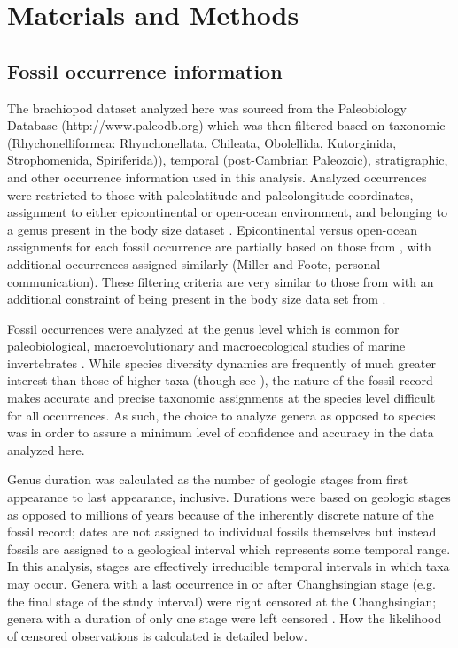 \documentclass{article}
\begin{document}
\section{Materials and Methods}

\subsection{Fossil occurrence information}

The brachiopod dataset analyzed here was sourced from the Paleobiology Database (http://www.paleodb.org) which was then filtered based on taxonomic (Rhychonelliformea: Rhynchonellata, Chileata, Obolellida, Kutorginida, Strophomenida, Spiriferida)), temporal (post-Cambrian Paleozoic), stratigraphic, and other occurrence information used in this analysis. Analyzed occurrences were restricted to those with paleolatitude and paleolongitude coordinates, assignment to either epicontinental or open-ocean environment, and belonging to a genus present in the body size dataset \citep{Payne2014}. Epicontinental versus open-ocean assignments for each fossil occurrence are partially based on those from \citet{Miller2009a}, with additional occurrences assigned similarly (Miller and Foote, personal communication). These filtering criteria are very similar to those from \citet{Foote2013} with an additional constraint of being present in the body size data set from \citet{Payne2014}. 

Fossil occurrences were analyzed at the genus level which is common for paleobiological, macroevolutionary and macroecological studies of marine invertebrates \citep{Alroy2010,Foote2013,Harnik2013,Kiessling2007a,Miller2009a,Nurnberg2013a,Nurnberg2015,Payne2007,Simpson2009,Vilhena2013}. While species diversity dynamics are frequently of much greater interest than those of higher taxa (though see \citealt{Foote2014b,Hoehn2015}), the nature of the fossil record makes accurate and precise taxonomic assignments at the species level difficult for all occurrences. As such, the choice to analyze genera as opposed to species was in order to assure a minimum level of confidence and accuracy in the data analyzed here.

Genus duration was calculated as the number of geologic stages from first appearance to last appearance, inclusive. Durations were based on geologic stages as opposed to millions of years because of the inherently discrete nature of the fossil record; dates are not assigned to individual fossils themselves but instead fossils are assigned to a geological interval which represents some temporal range. In this analysis, stages are effectively irreducible temporal intervals in which taxa may occur. Genera with a last occurrence in or after Changhsingian stage (e.g. the final stage of the study interval) were right censored at the Changhsingian; genera with a duration of only one stage were left censored \citep{Klein2003}. How the likelihood of censored observations is calculated is detailed below.
\end{document}
